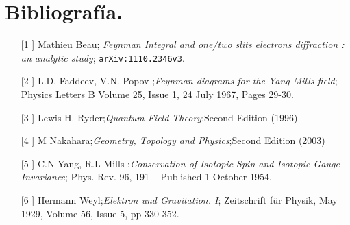 \chapter{Bibliografía.}
\begin{itemize}
\item[[1]] Mathieu Beau; \textit{Feynman Integral and one/two slits electrons diffraction : an analytic study}; \texttt{arXiv:1110.2346v3}.
\item[[2]]  L.D. Faddeev,  V.N. Popov ;\textit{Feynman diagrams for the Yang-Mills field}; Physics Letters B Volume 25, Issue 1, 24 July 1967, Pages 29-30.
\item[[3]] Lewis H. Ryder;\textit{Quantum Field Theory};Second Edition (1996) 
\item[[4]] M Nakahara;\textit{Geometry, Topology and Physics};Second Edition (2003) 
\item[[5]]  C.N Yang,  R.L Mills ;\textit{Conservation of Isotopic Spin and Isotopic Gauge Invariance}; Phys. Rev. 96, 191 – Published 1 October 1954.
\item[[6]]  Hermann Weyl;\textit{Elektron und Gravitation. I}; Zeitschrift für Physik, May 1929, Volume 56, Issue 5, pp 330-352.

\end{itemize}